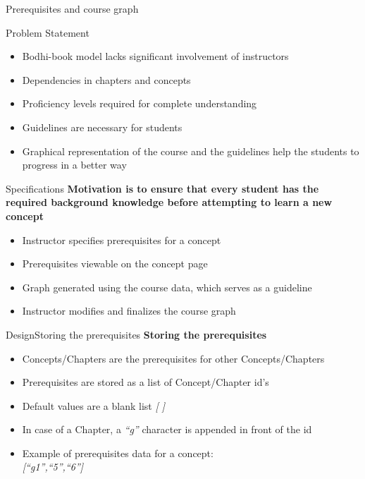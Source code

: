 \documentclass[xcolor=table]{beamer}
\begin{document}
\begin{frame}{Prerequisites and course graph}
	\begin{block}{Problem Statement}
		\begin{itemize}
			\item Bodhi-book model lacks significant involvement of instructors
			\item Dependencies in chapters and concepts
			\item Proficiency levels required for complete understanding
			\item Guidelines are necessary for students
			\item Graphical representation of the course and the guidelines help the students to progress in a better way
		\end{itemize}
	\end{block}
\end{frame}

\begin{frame}{Specifications}
	\textbf{Motivation is to ensure that every student has the required background knowledge before attempting to learn a new concept}
	\begin{itemize}
		\item Instructor specifies prerequisites for a concept
		\item Prerequisites viewable on the concept page
		\item Graph generated using the course data, which serves as a guideline
		\item Instructor modifies and finalizes the course graph
	\end{itemize}	
\end{frame}

\begin{frame}{Design}{Storing the prerequisites}
	\textbf{Storing the prerequisites}
	\begin{itemize}
		\item Concepts/Chapters are the prerequisites for other Concepts/Chapters
		\item Prerequisites are stored as a list of Concept/Chapter id's
		\item Default values are a blank list \textit{[ ]}
		\item In case of a Chapter, a \textit{``g''} character is appended in front of the id
		\item Example of prerequisites data for a concept: \\
		\textit{[``g1'',``5'',``6'']}
	\end{itemize}
\end{frame}
\end{document}
